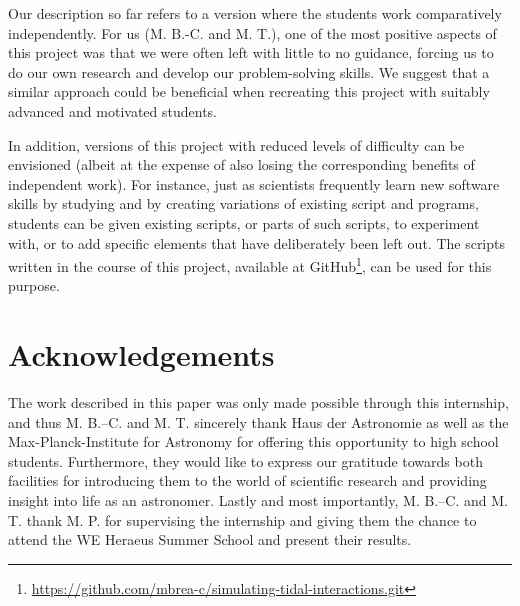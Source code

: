 \documentclass[11pt,twocolumn]{article}
\begin{document}
Our description so far refers to a version where the students work comparatively independently. For us (M. B.-C. and M. T.), one of the most positive aspects of this project was that we were often left with little to no guidance, forcing us to do our own research and develop our problem-solving skills. We suggest that a similar approach could be beneficial when recreating this project with suitably advanced and motivated students.

In addition, versions of this project with reduced levels of difficulty can be envisioned (albeit at the expense of also losing the corresponding benefits of independent work). For instance, just as scientists frequently learn new software skills by studying and by creating variations of existing script and programs, students can be given existing scripts, or parts of such scripts, to experiment with, or to add specific elements that have deliberately been left out. The scripts written in the course of this project, available at GitHub\footnote{\href{https://github.com/mbrea-c/simulating-tidal-interactions.git}{https://github.com/mbrea-c/simulating-tidal-interactions.git}}, can be used for this purpose. 


\section*{Acknowledgements}
    
    The work described in this paper was only made possible through this internship, and thus M. B.--C. and M. T.  sincerely thank Haus der Astronomie as well as the Max-Planck-Institute for Astronomy for offering this opportunity to high school students. Furthermore, they would like to express our gratitude towards both facilities for introducing them to the world of scientific research and providing insight into life as an astronomer. Lastly and most importantly, M. B.--C. and M. T. thank M. P. for supervising the internship and giving them the chance to attend the WE Heraeus Summer School and present their results.
    
    \clearpage
    
    {}
    
    
\end{document}
